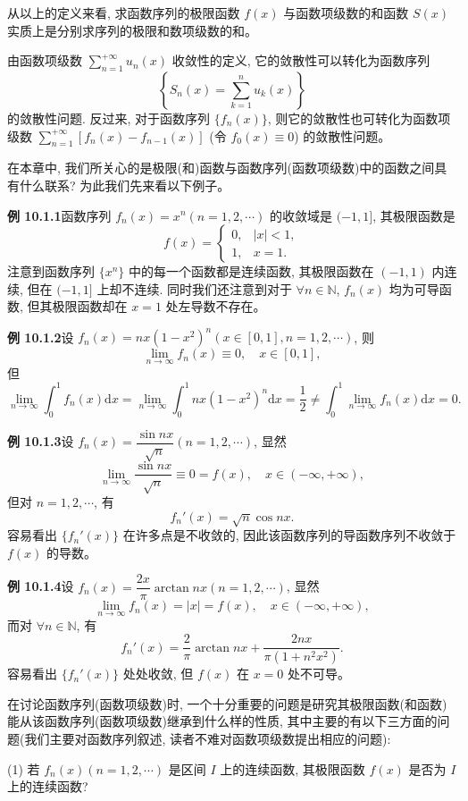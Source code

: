 \documentclass[UTF8,12pt,a4paper,fontset=fandol]{ctexart}
\begin{document}
从以上的定义来看, 求函数序列的极限函数 $f(x)$ 与函数项级数的和函数 $S(x)$ 实质上是分别求序列的极限和数项级数的和。

由函数项级数 $\sum\limits_{n=1}^{+\infty}u_n(x)$ 收敛性的定义, 它的敛散性可以转化为函数序列
\[
  \left\{S_n(x)=\sum_{k=1}^n u_k(x)\right\}
\]
的敛散性问题. 反过来, 对于函数序列 $\{f_n(x)\}$, 则它的敛散性也可转化为函数项级数 $\sum\limits_{n=1}^{+\infty}[f_n(x)-f_{n-1}(x)]$ (令 $f_0(x)\equiv0$) 的敛散性问题。

在本章中, 我们所关心的是极限(和)函数与函数序列(函数项级数)中的函数之间具有什么联系? 为此我们先来看以下例子。

\noindent\textbf{例 10.1.1}\quad 函数序列 $f_n(x)=x^n(n=1,2,\cdots)$ 的收敛域是 $(-1,1]$, 其极限函数是
\[
  f(x)=
  \begin{cases}
    0, & |x|<1,\\
    1, & x=1.
  \end{cases}
\]
注意到函数序列 $\{x^n\}$ 中的每一个函数都是连续函数, 其极限函数在 $(-1,1)$ 内连续, 但在 $(-1,1]$ 上却不连续. 同时我们还注意到对于 $\forall n\in\mathbb N$, $f_n(x)$ 均为可导函数, 但其极限函数却在 $x=1$ 处左导数不存在。

\noindent\textbf{例 10.1.2}\quad 设 $f_n(x)=nx(1-x^2)^n(x\in[0,1],n=1,2,\cdots)$, 则
\[
  \lim_{n\to\infty}f_n(x)\equiv0,\quad x\in[0,1],
\]
但
\[
  \lim_{n\to\infty}\int_0^1 f_n(x)\mathrm dx
  =\lim_{n\to\infty}\int_0^1 nx(1-x^2)^n\mathrm dx
  =\frac12
  \ne \int_0^1\lim_{n\to\infty}f_n(x)\mathrm dx=0.
\]

\noindent\textbf{例 10.1.3}\quad 设 $f_n(x)=\dfrac{\sin nx}{\sqrt n}(n=1,2,\cdots)$, 显然
\[
  \lim_{n\to\infty}\frac{\sin nx}{\sqrt n}\equiv0=f(x),\quad x\in(-\infty,+\infty),
\]
但对 $n=1,2,\cdots$, 有
\[
  f_n'(x)=\sqrt n\cos nx.
\]
容易看出 $\{f_n'(x)\}$ 在许多点是不收敛的, 因此该函数序列的导函数序列不收敛于 $f(x)$ 的导数。

\noindent\textbf{例 10.1.4}\quad 设 $f_n(x)=\dfrac{2x}{\pi}\arctan nx(n=1,2,\cdots)$, 显然
\[
  \lim_{n\to\infty}f_n(x)=|x|=f(x),\quad x\in(-\infty,+\infty),
\]
而对 $\forall n\in\mathbb N$, 有
\[
  f_n'(x)=\frac2\pi\arctan nx+\frac{2nx}{\pi(1+n^2x^2)}.
\]
容易看出 $\{f_n'(x)\}$ 处处收敛, 但 $f(x)$ 在 $x=0$ 处不可导。

在讨论函数序列(函数项级数)时, 一个十分重要的问题是研究其极限函数(和函数)能从该函数序列(函数项级数)继承到什么样的性质, 其中主要的有以下三方面的问题(我们主要对函数序列叙述, 读者不难对函数项级数提出相应的问题):

(1) 若 $f_n(x)(n=1,2,\cdots)$ 是区间 $I$ 上的连续函数, 其极限函数 $f(x)$ 是否为 $I$ 上的连续函数?
\end{document}
